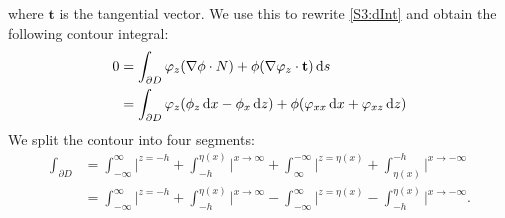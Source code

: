where $\textbf{t}$ is the tangential vector. We use this to rewrite \eqref{S3:dInt} and obtain the following contour integral:
\begin{equation}
\begin{aligned}
0 &= \int_{\partial D} \varphi_z(\nabla  \phi \cdot N) + \phi(\nabla  \varphi_z \cdot \textbf{t}) \,\mathrm{d} s \nonumber \\
&= \int_{\partial D} \varphi_z (\phi_z \,\mathrm{d} x - \phi_x \,\mathrm{d} z) + \phi(\varphi_{xx} \,\mathrm{d} x + \varphi_{xz} \,\mathrm{d} z) \label{S3:DimContInt}
\end{aligned}
\end{equation}
We split the contour into four segments:
\begin{align*}
\int_{\partial D} &= \int^{\infty}_{-\infty} \bigg|^{z = -h} + \int_{-h}^{\eta(x)} \bigg|^{x \to \infty}+ \int_{\infty}^{-\infty}\bigg|^{z=\eta(x)} + \int_{\eta(x)}^{-h}\bigg|^{x \to -\infty} \\
&=  \int^{\infty}_{-\infty} \bigg|^{z = -h} +  \int_{-h}^{\eta(x)} \bigg|^{x \to \infty} - \int_{-\infty}^{\infty}\bigg|^{z=\eta(x)} -  \int^{\eta(x)}_{-h} \bigg|^{x \to -\infty}.
\end{align*}
